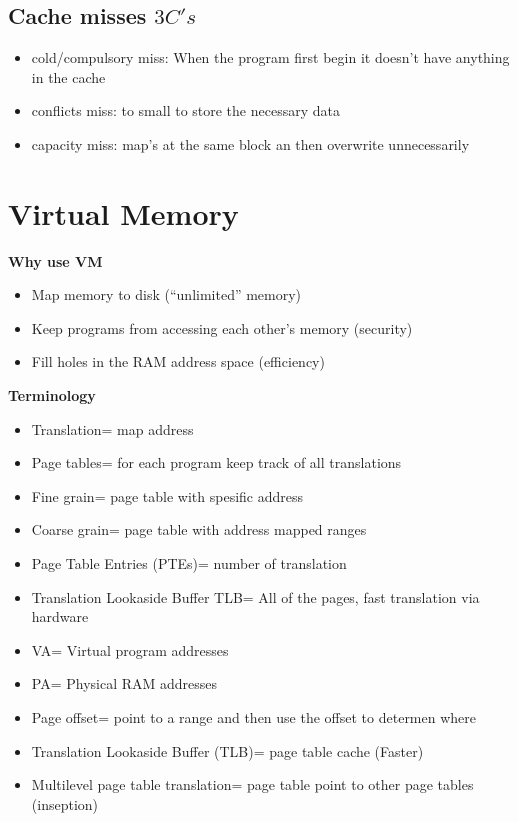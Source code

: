 \subsection{Cache misses $3C's$}
\begin{itemize}
\item  cold/compulsory miss: When the program first begin it doesn't have anything in the cache
\item  conflicts miss: to small to store the necessary data
\item  capacity miss: map's at the same block an then overwrite unnecessarily 
\end{itemize}



\section{Virtual Memory}
\textbf{Why use VM}
\begin{itemize}
\item  Map memory to disk (“unlimited” memory)
\item  Keep programs from accessing each other’s memory (security)
\item  Fill holes in the RAM address space (efficiency)
\end{itemize}

\textbf{Terminology}
\begin{itemize}
\item  Translation= map address
\item  Page tables= for each program keep track of all translations
\item  Fine grain= page table with spesific address
\item  Coarse grain= page table with address mapped ranges
\item  Page Table Entries (PTEs)= number of translation  
\item  Translation Lookaside Buffer TLB= All of the pages, fast translation via hardware
\item  VA= Virtual program addresses
\item  PA= Physical RAM addresses
\item  Page offset= point to a range and then use the offset to determen where
\item  Translation Lookaside Buffer (TLB)= page table cache (Faster)
\item  Multilevel page table translation= page table point to other page tables (inseption)
\end{itemize}



